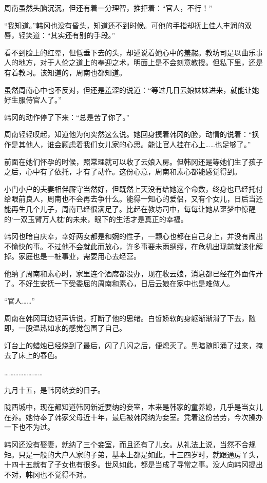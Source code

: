 周南虽然头脑沉沉，但还有着一分理智，推拒着：“官人，不行！”

“我知道。”韩冈也没有昏头，知道还不到时候。可他的手指却抚上佳人丰润的双唇，轻笑道：“其实还有别的手段。”

看不到脸上的红晕，但低垂下去的头，却述说着她心中的羞赧。教坊司是以曲乐事人的地方，对于人伦之道上的奉迎之术，明面上是不会刻意教授。但私下里，还是有着教习。该知道的，周南也都知道。

虽然周南心中也不反对，但还是羞涩的说道：“等过几日云娘妹妹进来，就能让她好生服侍官人了。”

韩冈的动作停了下来：“总是苦了你了。”

周南轻轻叹起，知道他为何突然这么说。她回身摸着韩冈的脸，动情的说着：“换作是其他人，谁会顾虑着我们女儿家的心思。能让官人挂在心上……也足够了。”

前面在她们怀孕的时候，照常理就可以收了云娘入房。但韩冈还是等她们生了孩子之后，心中有了依托，才有了动作。这份心意，周南和素心都能感觉得到。

小门小户的夫妻相伴厮守当然好，但既然上天没有给她这个命数，终身也已经托付给眼前良人，周南也不会再去争什么。能得一知心的爱侣，又有个女儿，日后当还能再生几个儿子，周南已经很满足了。比起在教坊司中，每每让她从噩梦中惊醒的‘一双玉臂万人枕’的未来，眼下的生活才是真正的幸福。

韩冈也暗自庆幸，幸好两女都是和婉的性子，一颗心也都在自己身上，并没有闹出不愉快的事。不过他不会就此而放心，许多事要未雨绸缪，在危机出现前就该化解掉。家庭也是一桩事业，需要用心去经营。

他纳了周南和素心时，家里连个酒席都没办，现在收云娘，消息都已经在外面传开了。不好生安抚一下受委屈的周南和素心，日后云娘在家中也是难做人。

“官人……”

周南在韩冈耳边轻声诉说，打断了他的思绪。白皙娇软的身躯渐渐滑了下去，随即，一股温热如水的感觉包围了自己。

灯台上的蜡烛已经烧到了最后，闪了几闪之后，便熄灭了。黑暗随即涌了过来，掩去了床上的春色。

……………………

九月十五，是韩冈纳妾的日子。

陇西城中，现在都知道韩冈新近要纳的妾室，本来是韩家的童养媳，几乎是当女儿在养。她侍奉了韩家父母近十年，最后被韩冈纳为妾室。凭着这份苦劳，今次操办一下也不为过。

韩冈还没有娶妻，就纳了三个妾室，而且还有了儿女。从礼法上说，当然不合规矩。只是一般的大户人家的子弟，基本上都是如此。十三四岁时，就跟通房丫头，十四十五就有了子女也有很多。世风如此，都是当成了寻常之事。没人向韩冈提出不对，韩冈也不觉得不对。

